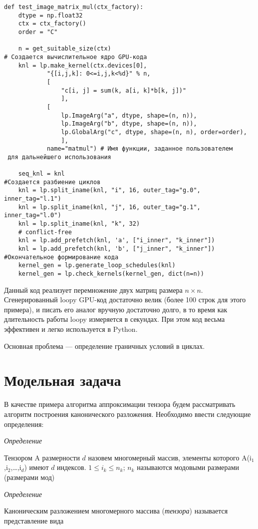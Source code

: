 \documentclass{scrartcl}
\begin{document}
\begin{verbatim}
def test_image_matrix_mul(ctx_factory):
    dtype = np.float32
    ctx = ctx_factory()
    order = "C"

    n = get_suitable_size(ctx)
# Создается вычислительное ядро GPU-кода
    knl = lp.make_kernel(ctx.devices[0],
            "{[i,j,k]: 0<=i,j,k<%d}" % n,
            [
                "c[i, j] = sum(k, a[i, k]*b[k, j])"
                ],
            [
                lp.ImageArg("a", dtype, shape=(n, n)),
                lp.ImageArg("b", dtype, shape=(n, n)),
                lp.GlobalArg("c", dtype, shape=(n, n), order=order),
                ],
            name="matmul") # Имя функции, заданное пользователем
 для дальнейшего использования

    seq_knl = knl
#Создается разбиение циклов
    knl = lp.split_iname(knl, "i", 16, outer_tag="g.0", inner_tag="l.1")
    knl = lp.split_iname(knl, "j", 16, outer_tag="g.1", inner_tag="l.0")
    knl = lp.split_iname(knl, "k", 32)
    # conflict-free
    knl = lp.add_prefetch(knl, 'a', ["i_inner", "k_inner"])
    knl = lp.add_prefetch(knl, 'b', ["j_inner", "k_inner"])
#Окончательное формирование кода
    kernel_gen = lp.generate_loop_schedules(knl)
    kernel_gen = lp.check_kernels(kernel_gen, dict(n=n))
\end{verbatim}
Данный код реализует перемножение двух матриц размера $n\times n$.
Сгенерированный loopy GPU-код достаточно велик (более 100 строк для этого примера), 
и писать его аналог вручную достаточно долго, в то время как длительность работы loopy измеряется в секундах. При этом код весьма эффективен и легко используется в Python.

Основная проблема --- определение граничных условий в циклах.
\section{Модельная задача}
\label{sec-5}


В качестве примера алгоритма аппроксимации тензора будем рассматривать алгоритм построения канонического разложения.
Необходимо ввести следующие определения:

\emph{Определение}
  
 Тензором A размерности $d$ назовем многомерный массив, элементы которого A(i$_1$,i$_2$,\ldots,i$_d$) имеют $d$ 
индексов. $1 \leq i_k \leq n_k$; $n_k$ называются модовыми размерами (размерами мод)
    
 \emph{Определение}

 Каноническим разложением многомерного массива (\emph{тензора}) 
называется представление вида 
\end{document}
